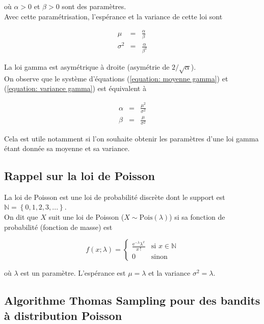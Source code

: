 \documentclass[letterpaper,11pt]{article}
\renewcommand{\exp}[1]{\mathrm{e}^{#1}}
\begin{document}
où $\alpha>0$ et $\beta>0$ sont des paramètres. \\
Avec cette paramétrisation, l'espérance et la variance de cette loi sont

\begin{eqnarray} 
\mu      &=& \frac{\alpha}{\beta} \label{equation: moyenne gamma}\\
\sigma^2 &=& \frac{\alpha}{\beta^2} \label{equation: variance gamma}
\end{eqnarray}

La loi gamma est asymétrique à droite (asymétrie de $2/\sqrt{\alpha}$).\\
On observe que le système d'équations (\ref{equation: moyenne gamma}) et (\ref{equation: variance gamma}) est équivalent à

\begin{eqnarray}
\alpha   &=& \frac{\mu^2}{\sigma^2} \label{equation: alpha gamma}\\
\beta &=& \frac{\mu}{\sigma^2} \label{equation: beta gamma}
\end{eqnarray}

Cela est utile notamment si l'on souhaite obtenir les paramètres d'une loi gamma étant donnée sa moyenne et sa variance.

\subsection{Rappel sur la loi de Poisson}

La loi de Poisson est une loi de probabilité discrète dont le support est $\mathbb{N}=\left\{0,1,2,3,...\right\}.$\\
On dit que $X$ suit une loi de Poisson ($X\sim\mathrm{Pois}(\lambda)$) si sa fonction de probabilité (fonction de masse) est

\begin{equation*}
f(x; \lambda) = 
\left\{
\begin{array}{cl}
\frac{\exp{-\lambda} \lambda^x}{x\,!} & \text{si } x\in\mathbb{N}\\[0.4cm]
0 & \text{sinon}
\end{array}
\right.
\end{equation*}

où $\lambda$ est un paramètre. L'espérance est $\mu=\lambda$ et la variance $\sigma^2=\lambda.$

\subsection{Algorithme Thomas Sampling pour des bandits à distribution Poisson }
\end{document}
